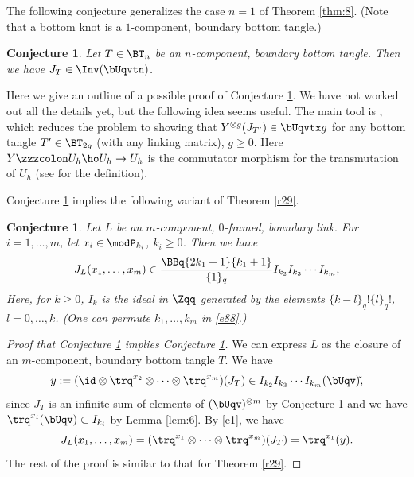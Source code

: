 \documentclass{amsart}
\numberwithin{equation}{section}
\numberwithin{figure}{section}
\theoremstyle{plain}
\newtheorem{conjecture}[theorem]{Conjecture}
\theoremstyle{definition}
\theoremstyle{remark}
\begin{document}
The following conjecture generalizes the case $n=1$ of Theorem
\ref{thm:8}.  (Note that a bottom knot is a $1$-component, boundary
bottom tangle.)

\begin{conjecture}
  \label{r81}
  Let $T\in \BT_n$ be an $n$-component, boundary bottom tangle.
  Then we have $J_T\in \Inv(\bUqvtn)$.
\end{conjecture}

Here we give an outline of a possible proof of Conjecture \ref{r81}.
We have not worked out all the details yet, but the following idea
seems useful.  The main tool is \cite[Theorem 9.9]{H:universal}, which
reduces the problem to showing that $Y^{\otimes g}(J_{T'})\in \bUqvtx g$ for
any bottom tangle $T'\in \BT_{2g}$ (with any linking matrix), $g\ge 0$.
Here $Y\zzzcolon U_h\ho U_h\rightarrow U_h$ is the commutator morphism for the
transmutation of $U_h$ (see \cite[Section 9.3]{H:universal} for the
definition).

Conjecture \ref{r81} implies the following variant of Theorem
\ref{r29}.

\begin{conjecture}
  \label{r20}
  Let $L$ be an $m$-component, $0$-framed, boundary link.  For
  $i=1,\ldots,m$, let $x_i\in \modP _{k_i}$, $k_i\ge 0$.  Then we have
  \begin{equation}
    \label{e88}
    J_L(x_1,\ldots,x_m)
    \in \frac{\BBq{2k_1+1}{k_1+1}}{\{1\}_q}I_{k_2}I_{k_3}\cdots I_{k_m},
  \end{equation}
  Here, for $k\ge 0$, $I_k$ is the ideal in $\Zqq$ generated by the
  elements $\{k-l\}_q!\{l\}_q!$, $l=0,\ldots,k$.  (One can permute
  $k_1,\ldots,k_m$ in \eqref{e88}.)
\end{conjecture}

\begin{proof}[Proof that Conjecture \ref{r81} implies Conjecture \ref{r20}]
  We can express $L$ as the closure of an $m$-component, boundary
  bottom tangle $T$.  We have
  \begin{equation*}
    y:=(\id\otimes \trq^{x_2}\otimes \cdots\otimes \trq^{x_m})(J_T)
    \in I_{k_2}I_{k_3}\cdots I_{k_m}(\bUqv)\tilde{},
  \end{equation*}
  since $J_T$ is an infinite sum of elements of $(\bUqv)^{\otimes m}$ by
  Conjecture \ref{r81} and we have $\trq^{x_i}(\bUqv)\subset I_{k_i}$ by
  Lemma \ref{lem:6}.  By \eqref{e1}, we have
  \begin{equation*}
    J_L(x_1,\ldots,x_m)=(\trq^{x_1}\otimes \cdots\otimes \trq^{x_m})(J_T)=\trq^{x_1}(y).
  \end{equation*}
  The rest of the proof is similar to that for Theorem \ref{r29}.
\end{proof}
\end{document}
